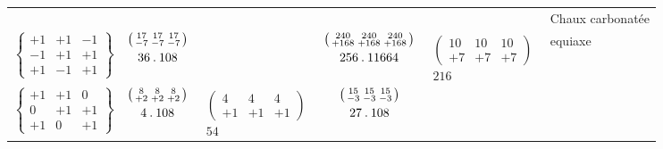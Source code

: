 \begin{center}\scriptsize
\setlength{\tabcolsep}{2pt}
\begin{tabular}{ccccc l}
&&&&&Chaux carbonatée\\
$\left\{\begin{smallmatrix}+1&+1&-1\\-1&+1&+1\\+1&-1&+1\end{smallmatrix}\right\}$&
$\begin{gathered}\left(\begin{smallmatrix}17&17&17\\-7&-7&-7\end{smallmatrix}\right)\\36\mathbin{.}108\end{gathered}$&&
$\begin{gathered}\left(\begin{smallmatrix}240&240&240\\+168&+168&+168\end{smallmatrix}\right)\\256\mathbin{.}11664\end{gathered}$&
$\begin{gathered}\left(\begin{smallmatrix}10&10&10\\+7&+7&+7\end{smallmatrix}\right)\\216\end{gathered}$&equiaxe\\[1.4ex]
$\left\{\begin{smallmatrix}+1&+1&0\\0&+1&+1\\+1&0&+1\end{smallmatrix}\right\}$&
$\begin{gathered}\left(\begin{smallmatrix}8&8&8\\+2&+2&+2\end{smallmatrix}\right)\\4\mathbin{.}108\end{gathered}$&
$\begin{gathered}\left(\begin{smallmatrix}4&4&4\\+1&+1&+1\end{smallmatrix}\right)\\54\end{gathered}$&
$\begin{gathered}\left(\begin{smallmatrix}15&15&15\\-3&-3&-3\end{smallmatrix}\right)\\27\mathbin{.}108\end{gathered}$&

\end{tabular}
\end{center}
